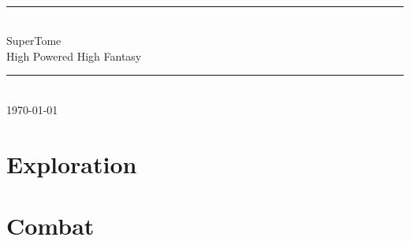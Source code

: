 \documentclass[12pt,oneside,onecolumn,openany,final]{memoir}
\begin{document}
\thispagestyle{empty}
\begin{center}
\textsc{\Large}\\[0.25cm]
\rule{\linewidth}{0.5mm} \\[0.7cm]
\fontsize{30}{30} \selectfont SuperTome\\[.35cm]
\fontsize{16}{18} \selectfont \guillemotleft{} High Powered High Fantasy \guillemotright{}\\
\rule{\linewidth}{0.5mm} \\[0.7cm]
\vfill
\normalsize{\today}
\end{center}

\pagebreak
\sffamily
\pagestyle{plain}
\raggedbottom

\renewcommand{\contentsname}{Table of Contents}
\setcounter{tocdepth}{1}
\small{\tableofcontents}


\clearpage{}


\clearpage{}


\clearpage{}


\clearpage{}


\clearpage{}


\clearpage{}


\clearpage{}


\clearpage{}
\chapter{Exploration}
\clearpage{}
\chapter{Combat}
\clearpage{}
\end{document}
